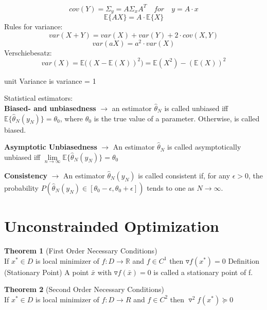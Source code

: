 \begin{equation*}
cov(Y) = \Sigma_y = A \Sigma_x A^T \quad for \quad y = A \cdot x
\end{equation*}
\begin{equation*}
\mathbb{E }\{AX\} =A \cdot \mathbb{ E }\{X\}
\end{equation*}
Rules for variance:
\begin{equation*}
var(X+Y) = var(X)+var(Y)+2 \cdot cov(X,Y)
\end{equation*}
\begin{equation*}
var(aX) = {a}^{2} \cdot var(X)
\end{equation*}
Verschiebesatz:
\begin{equation*}
var(X)={ { \mathbb{E}((X-\mathbb{E}(X)) }^{ 2 } })=\mathbb{E}({ X }^{ 2 })-{ (\mathbb{E}(X)) }^{ 2 }
\end{equation*}

unit Variance is variance = 1

Statistical estimators:\\
\textbf{Biased- and unbiasedness} $\rightarrow$ an estimator ${\hat{\theta}}_{N}$ is called unbiased iff $\mathbb{E}\{ {\hat{\theta}}_{N} ({y}_{N})\} = \theta_0$, where ${\theta}_{0}$ is the true value of a parameter. Otherwise, is called biased.

\textbf{Asymptotic Unbiasedness} $\rightarrow$ An estimator ${\hat{\theta}}_{N}$ is called asymptotically unbiased iff 
$
\lim\limits_{n \to \infty} \mathbb{E}\{ {\hat{\theta}}_{N} ({y}_{N}) \} = \theta_0
$

\textbf{Consistency} $\rightarrow$ An estimator ${\hat{\theta}}_{N} ({y}_{N})$ is called consistent if, for any $ \epsilon > 0$, the probability $
P( {\hat{\theta}}_{N} ({y}_{N}) \in [\theta_0 - \epsilon, \theta_0 + \epsilon])
$ tends to one as $N \rightarrow \infty$.


\newpage
\section*{Unconstrainded Optimization}
\textbf{Theorem 1} (First Order Necessary Conditions)\\
If $x^* \in D$ is local minimizer of $f : D \rightarrow \mathbb{R}$ and $f \in C^1$ then
$\triangledown f (x^*) = 0$
Definition (Stationary Point) A point $\bar{x}$ with $\triangledown f(\bar{x}) = 0$ is called a stationary point of f.

\textbf{Theorem 2} (Second Order Necessary Conditions)\\
If $x^* \in D$ is local minimizer of $f : D \rightarrow R$ and $f \in C^2$ then
$\triangledown^2 f(x^*) \succeq 0$

